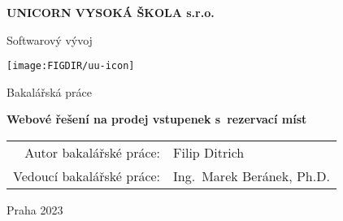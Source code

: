 \pagestyle{empty}
\begin{center}

{\bfseries\large UNICORN VYSOKÁ ŠKOLA s.r.o.}

    \vspace{5mm}

    {\Large Softwarový vývoj}

    \vfill
    \vspace{5mm}

    \centerline{\mbox{\texttt{[image: \\FIGDIR/uu-icon]}}}

    \vfill
    \vspace{5mm}

    {\large Bakalářská práce}

    \vspace{15mm}

    {\LARGE\bfseries Webové řešení na prodej vstupenek s~rezervací míst}

    \vfill

    \begin{tabular}{rl}
        Autor bakalářské práce:   & Filip Ditrich             \\
        \noalign{\vspace{2mm}}
        Vedoucí bakalářské práce: & Ing.\ Marek Beránek, Ph.D. \\
    \end{tabular}

    \vfill

    Praha 2023

\end{center}
